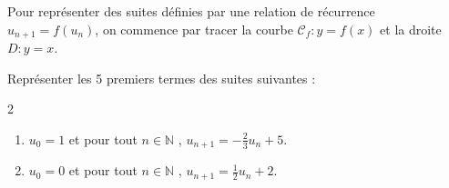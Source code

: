 \documentclass[main.tex]{subfiles}
\begin{document}
\begin{exercise}
\begin{problem}
\begin{enumerate}[label=\arabic*),leftmargin=*]
\end{enumerate}
\end{problem}

\end{exercise}
%	 
\newpage
\begin{eBox} Pour représenter des suites définies par  une relation de récurrence $u_{n+1}=f(u_n)$, on commence par tracer la courbe $\mathscr{C}_f\colon y=f(x)$ et la droite $D\colon y= x$.
\end{eBox}
\begin{example} 	Représenter les 5 premiers termes des suites suivantes :
\vspace{-0.5em}
\begin{multicols}{2}
\begin{enumerate}[label=\arabic*),leftmargin=*] 
	\item  $u_0=1$ et pour tout $n\in\mathbb{N}$ , $u_{n+1}=-\tfrac{2}{3}u_n+5$.
	\item  $u_0=0$ et pour tout $n\in\mathbb{N}$ , $u_{n+1}= \tfrac{1}{2}u_n+2$.
\end{enumerate}
\end{multicols}
\end{example}
\noindent
\end{document}
